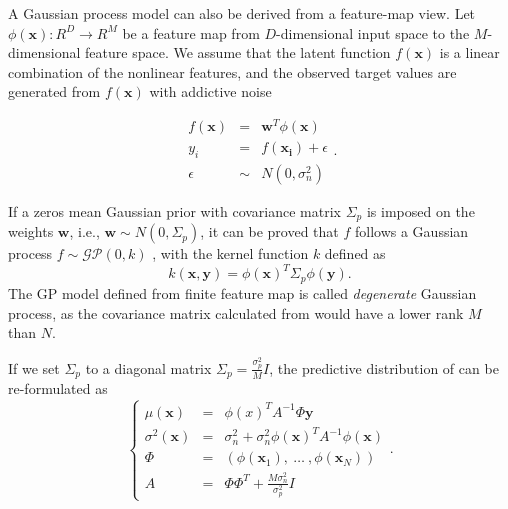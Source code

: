 A Gaussian process model can also be derived from a feature-map view. Let $\phi(\bm{x}): R^D \rightarrow R^M$ be a feature map from $D$-dimensional input space to the $M$-dimensional feature space. We assume that the latent function $f(\bm{x})$ is a linear combination of the nonlinear features, and the observed target values are generated from $f(\bm{x})$ with addictive noise

\begin{equation}
    \label{eq:weightspace}
    \begin{array}{lll}
        f(\bm{x}) &=&    \bm{w}^T \phi(\bm{x})   \\
        y_i       &=&    f(\bm{x_i}) + \epsilon  \\
        \epsilon  &\sim& N(0, \sigma_n^2)
    \end{array}.
\end{equation}

If a zeros mean Gaussian prior with covariance matrix $\Sigma_p$ is imposed on the weights $\bm{w}$, i.e., $\bm{w} \sim N(0, \Sigma_p)$, it can be proved that $f$ follows a Gaussian process $f \sim \mathcal{GP}(0, k)$ \cite{GPML}, with the kernel function $k$ defined as
\begin{equation}
    \label{eq:kernel_from_weight}
    k(\bm{x}, \bm{y}) = \phi(\bm{x})^T \Sigma_p \phi(\bm{y}).
\end{equation}
The GP model defined from finite feature map is called \emph{degenerate} Gaussian process, as the covariance matrix calculated from  would have a lower rank $M$ than $N$.


If we set $\Sigma_p$ to a diagonal matrix $\Sigma_p = \frac{\sigma_p^2}{M} I$, the predictive distribution of  can be re-formulated as
\begin{equation}
    \left\{
        \begin{array}{lll}
            \mu(\bm{x})      &= & \phi(x)^T A^{-1} \Phi \bm{y} \\
            \sigma^2(\bm{x}) &= & \sigma_n^2 + \sigma_n^2 \phi(\bm{x})^T A^{-1} \phi(\bm{x}) \\
            \Phi             &= & (\phi(\bm{x}_1),~\dots~,\phi(\bm{x}_N)) \\
            A                &= & \Phi \Phi^T + \frac{M \sigma_n^2}{\sigma_p^2} I
        \end{array}.
    \right.
    \label{eq:DegeneratePred}
\end{equation}

